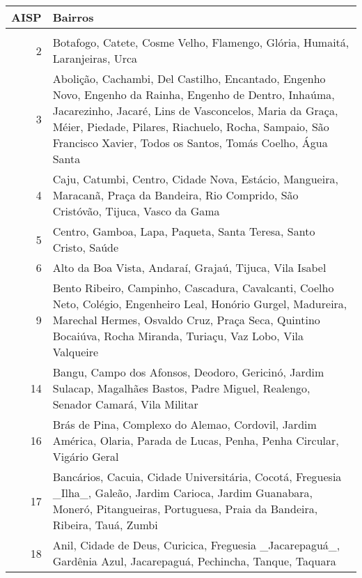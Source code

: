\begin{tabular}{rl}
\toprule
 AISP &                                                                                                                                                                                                                                                                                  Bairros \\
\midrule
      &                                                                                                                                                                                                                                                                                          \\
 2 &  Botafogo, Catete, Cosme Velho, Flamengo, Glória, Humaitá, Laranjeiras, Urca \\
 3 &  Abolição, Cachambi, Del Castilho, Encantado, Engenho Novo, Engenho da Rainha, Engenho de Dentro, Inhaúma, Jacarezinho, Jacaré, Lins de Vasconcelos, Maria da Graça, Méier, Piedade, Pilares, Riachuelo, Rocha, Sampaio, São Francisco Xavier, Todos os Santos, Tomás Coelho, Água Santa \\
 4 &  Caju, Catumbi, Centro, Cidade Nova, Estácio, Mangueira, Maracanã, Praça da Bandeira, Rio Comprido, São Cristóvão, Tijuca, Vasco da Gama \\
 5 &  Centro, Gamboa, Lapa, Paqueta, Santa Teresa, Santo Cristo, Saúde \\
 6 &  Alto da Boa Vista, Andaraí, Grajaú, Tijuca, Vila Isabel \\
 9 &  Bento Ribeiro, Campinho, Cascadura, Cavalcanti, Coelho Neto, Colégio, Engenheiro Leal, Honório Gurgel, Madureira, Marechal Hermes, Osvaldo Cruz, Praça Seca, Quintino Bocaiúva, Rocha Miranda, Turiaçu, Vaz Lobo, Vila Valqueire \\
 14 &  Bangu, Campo dos Afonsos, Deodoro, Gericinó, Jardim Sulacap, Magalhães Bastos, Padre Miguel, Realengo, Senador Camará, Vila Militar \\
 16 &  Brás de Pina, Complexo do Alemao, Cordovil, Jardim América, Olaria, Parada de Lucas, Penha, Penha Circular, Vigário Geral \\
 17 &  Bancários, Cacuia, Cidade Universitária, Cocotá, Freguesia \_Ilha\_, Galeão, Jardim Carioca, Jardim Guanabara, Moneró, Pitangueiras, Portuguesa, Praia da Bandeira, Ribeira, Tauá, Zumbi \\
 18 &  Anil, Cidade de Deus, Curicica, Freguesia \_Jacarepaguá\_, Gardênia Azul, Jacarepaguá, Pechincha, Tanque, Taquara \\

\end{tabular}
